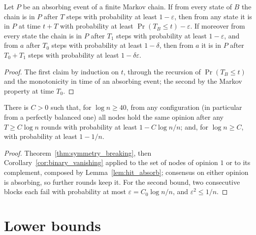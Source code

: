 \begin{lemma}\label{lem:hit_absorb}
  \leanok
  Let $P$ be an absorbing event of a finite Markov chain. If from every state of $B$ the chain is
  in $P$ after $T$ steps with probability at least $1 - \varepsilon$, then from any state it is in
  $P$ at time $t + T$ with probability at least $\Pr(T_B \le t) - \varepsilon$. If moreover from
  every state the chain is in $P$ after $T_1$ steps with probability at least $1 - \varepsilon$,
  and from $a$ after $T_0$ steps with probability at least $1 - \delta$, then from $a$ it is in
  $P$ after $T_0 + T_1$ steps with probability at least $1 - \delta\varepsilon$.
\end{lemma}
\begin{proof}
  \leanok
  The first claim by induction on $t$, through the recursion of $\Pr(T_B \le t)$ and the
  monotonicity in time of an absorbing event; the second by the Markov property at time $T_0$.
\end{proof}

\begin{theorem}\label{thm:any_start}
  \leanok
  There is $C > 0$ such that, for $\log n \ge 40$, from any configuration (in particular from a
  perfectly balanced one) all nodes hold the same opinion after any $T \ge C\log n$ rounds with
  probability at least $1 - C\log n/n$; and, for $\log n \ge C$, with probability at least
  $1 - 1/n$.
\end{theorem}
\begin{proof}
  \leanok
  Theorem~\ref{thm:symmetry_breaking}, then Corollary~\ref{cor:binary_vanishing} applied to the
  set of nodes of opinion $1$ or to its complement, composed by Lemma~\ref{lem:hit_absorb};
  consensus on either opinion is absorbing, so further rounds keep it. For the second bound, two
  consecutive blocks each fail with probability at most $\varepsilon = C_0\log n/n$, and
  $\varepsilon^2 \le 1/n$.
\end{proof}

\section{Lower bounds}\label{sec:lower}

